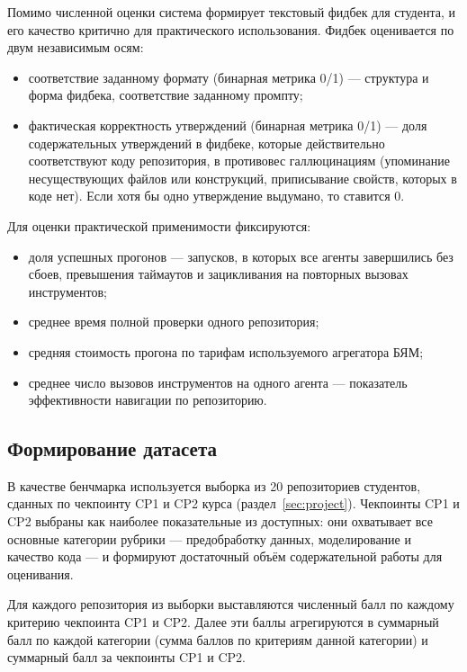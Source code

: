 Помимо численной оценки система
формирует текстовый фидбек для студента, и его качество критично для
практического использования. Фидбек оценивается по двум независимым
осям:
\begin{itemize}
    \item соответствие заданному формату (бинарная метрика
    0/1) --- структура и форма фидбека, соответствие заданному промпту;
    \item фактическая корректность утверждений (бинарная метрика
    0/1) --- доля содержательных утверждений в фидбеке, которые
    действительно соответствуют коду репозитория, в противовес
    галлюцинациям (упоминание несуществующих файлов или конструкций,
    приписывание свойств, которых в коде нет). Если хотя бы одно утверждение выдумано,
    то ставится 0.
\end{itemize}
 
Для оценки практической применимости фиксируются:
\begin{itemize}
    \item доля успешных прогонов --- запусков, в которых все агенты
    завершились без сбоев, превышения таймаутов и зацикливания на
    повторных вызовах инструментов;
    \item среднее время полной проверки одного репозитория;
    \item средняя стоимость прогона по тарифам используемого
    агрегатора БЯМ;
    \item среднее число вызовов инструментов на одного агента ---
    показатель эффективности навигации по репозиторию.
\end{itemize}

\subsection{Формирование датасета}
 
В качестве бенчмарка используется выборка из 20 репозиториев студентов,
сданных по чекпоинту CP1 и CP2 курса (раздел~\ref{sec:project}).
Чекпоинты CP1 и CP2 выбраны как наиболее показательные из доступных: они
охватывает все основные категории рубрики --- предобработку данных,
моделирование и качество кода --- и формируют достаточный
объём содержательной работы для оценивания.
 
Для каждого репозитория из выборки выставляются численный балл по каждому критерию чекпоинта CP1 и CP2.
Далее эти баллы агрегируются в суммарный балл по каждой категории (сумма баллов по критериям данной категории) 
и суммарный балл за чекпоинты CP1 и CP2.

